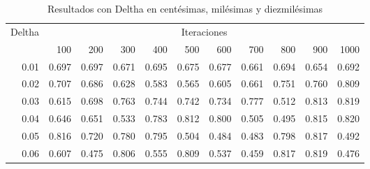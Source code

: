 \begin{table}[H]
\small
\caption{Resultados con Deltha en centésimas, milésimas y diezmilésimas}
\begin{tabular}{rrrrrrrrrrr}
\multicolumn{1}{l}{Deltha} & \multicolumn{10}{c}{Iteraciones}                                                                                                                                                                                                    \\
\multicolumn{1}{l}{}       & 100                  & 200                  & 300                  & 400                  & 500                  & 600                  & 700                  & 800                  & 900                  & 1000                 \\
0.01                       & 0.697                & 0.697                & 0.671                & 0.695                & 0.675                & 0.677                & 0.661                & 0.694                & 0.654                & 0.692                \\
0.02                       & 0.707                & 0.686                & 0.628                & 0.583                & 0.565                & 0.605                & 0.661                & 0.751                & 0.760                & 0.809                \\
0.03                       & 0.615                & 0.698                & 0.763                & 0.744                & 0.742                & 0.734                & 0.777                & 0.512                & 0.813                & 0.819                \\
0.04                       & 0.646                & 0.651                & 0.533                & 0.783                & 0.812                & 0.800                & 0.505                & 0.495                & 0.815                & 0.820                \\
0.05                       & 0.816                & 0.720                & 0.780                & 0.795                & 0.504                & 0.484                & 0.483                & 0.798                & 0.817                & 0.492                \\
0.06                       & 0.607                & 0.475                & 0.806                & 0.555                & 0.809                & 0.537                & 0.459                & 0.817                & 0.819                & 0.476                \\

\end{tabular}
\end{table}
